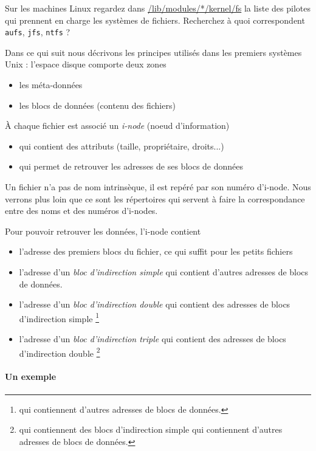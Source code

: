 \begin{multicols}{2}
\begin{exercice}
Sur les machines Linux regardez dans \url{/lib/modules/*/kernel/fs} la liste
des pilotes qui prennent en charge les systèmes de fichiers. Recherchez à quoi
correspondent \texttt{aufs}, \texttt{jfs}, \texttt{ntfs} ?
\end{exercice}

Dans ce qui suit
nous décrivons les principes utilisés dans les premiers systèmes Unix : 
l'espace disque comporte deux zones 
\begin{itemize}
\item les méta-données
\item les blocs de données (contenu des fichiers)
\end{itemize}


À chaque fichier est associé un \emph{i-node} (noeud d'information)
\begin{itemize}
\item qui contient 
des attributs (taille, propriétaire, droits...)
\item qui permet de retrouver les adresses de ses blocs de données
\end{itemize}

Un fichier n'a pas de nom intrinsèque, il est repéré par son numéro
d'i-node. Nous verrons plus loin que ce sont les répertoires qui servent
à faire
la correspondance entre des noms et des numéros d'i-nodes.

Pour pouvoir retrouver les données, l'i-node contient 
\begin{itemize}
\item l'adresse des premiers blocs du fichier, ce qui suffit pour les petits fichiers
\item l'adresse d'un \emph{bloc d'indirection simple}
qui contient d'autres adresses de blocs de données.
\item  l'adresse d'un \emph{bloc d'indirection double}
qui contient des adresses de blocs d'indirection simple
\footnote{qui contiennent d'autres adresses de blocs de données.}
\item  l'adresse d'un \emph{bloc d'indirection triple}
qui contient des adresses de blocs d'indirection double 
\footnote{qui contiennent des blocs d'indirection simple
qui contiennent d'autres adresses de blocs de données.}
\end{itemize}


\paragraph{Un exemple}


\end{multicols}

